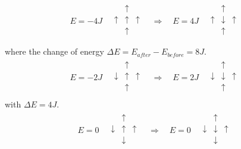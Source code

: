 \documentclass{emulateapj}
\begin{document}
\begin{align*}
    E = -4J
    \quad
    \begin{matrix}
    & \uparrow & \\
    \uparrow & \uparrow & \uparrow \\
    & \uparrow & \\
    \end{matrix}
    \quad
    \Longrightarrow
    \quad
    E = 4J
    \quad
    \begin{matrix}
    & \uparrow & \\
    \uparrow & \downarrow & \uparrow \\
    & \uparrow & \\
    \end{matrix} \\
\end{align*}
where the change of energy $\Delta E = E_{after} - E_{before} = 8J$.
\begin{align*}
    E = -2J
    \quad
    \begin{matrix}
    & \uparrow & \\
    \downarrow & \uparrow & \uparrow \\
    & \uparrow & \\
    \end{matrix}
    \quad
    \Longrightarrow
    \quad
    E = 2J
    \quad
    \begin{matrix}
    & \uparrow & \\
    \downarrow & \downarrow & \uparrow \\
    & \uparrow & \\
    \end{matrix}
\end{align*}
with $\Delta E = 4J$.
\begin{align*}
    E = 0
    \quad
    \begin{matrix}
    & \uparrow & \\
    \downarrow & \uparrow & \uparrow \\
    & \downarrow & \\
    \end{matrix}
    \quad
    \Longrightarrow
    \quad
    E = 0
    \quad
    \begin{matrix}
    & \uparrow & \\
    \downarrow & \downarrow & \uparrow \\
    & \downarrow & \\
    \end{matrix}
\end{align*}
\end{document}
